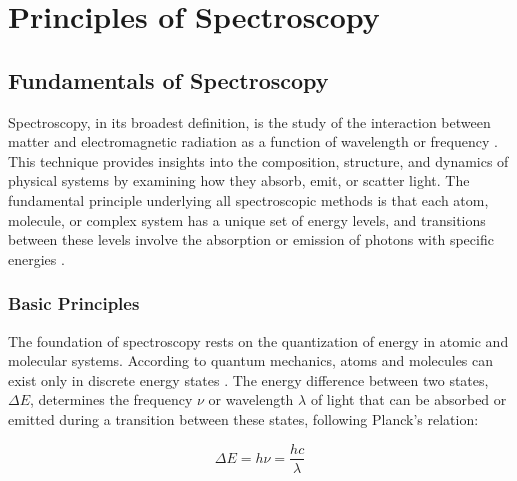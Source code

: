 \chapter{Principles of Spectroscopy} %

\label{chapter_spectroscopy} %


\section{Fundamentals of Spectroscopy}
\label{sec:spectroscopy_fundamentals}

\noindent Spectroscopy, in its broadest definition, is the study of the interaction between matter and electromagnetic radiation as a function of wavelength or frequency \cite{berman2011principleslaserspectroscopy, mukamel1995principlesnonlinearoptical}.
This technique provides insights into the composition, structure, and dynamics of physical systems by examining how they absorb, emit, or scatter light. The fundamental principle underlying all spectroscopic methods is that each atom, molecule, or complex system has a unique set of energy levels, and transitions between these levels involve the absorption or emission of photons with specific energies \cite{boyd2008chapter1nonlinear}.

\subsection{Basic Principles}
\label{subsec:basic_principles}

\noindent The foundation of spectroscopy rests on the quantization of energy in atomic and molecular systems. According to quantum mechanics, atoms and molecules can exist only in discrete energy states \cite{albashetal2012quantumadiabaticmarkovian}. The energy difference between two states, $\Delta E$, determines the frequency $\nu$ or wavelength $\lambda$ of light that can be absorbed or emitted during a transition between these states, following Planck's relation:

\begin{equation}
	\Delta E = h\nu = \frac{hc}{\lambda}
	\label{eq:planck_relation}
\end{equation}

